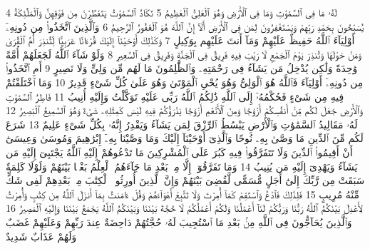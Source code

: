 {\tiny\colorbox{cl_aya}{4}} لَهُۥ مَا فِى ٱلسَّمَٰوَٰتِ وَمَا فِى ٱلْأَرْضِ وَهُوَ ٱلْعَلِىُّ ٱلْعَظِيمُ
{\tiny\colorbox{cl_aya}{5}} تَكَادُ ٱلسَّمَٰوَٰتُ يَتَفَطَّرْنَ مِن فَوْقِهِنَّ وَٱلْمَلَٰٓئِكَةُ يُسَبِّحُونَ بِحَمْدِ رَبِّهِمْ وَيَسْتَغْفِرُونَ لِمَن فِى ٱلْأَرْضِ أَلَآ إِنَّ ٱللَّهَ هُوَ ٱلْغَفُورُ ٱلرَّحِيمُ
{\tiny\colorbox{cl_aya}{6}} وَٱلَّذِينَ ٱتَّخَذُوا۟ مِن دُونِهِۦٓ أَوْلِيَآءَ ٱللَّهُ حَفِيظٌ عَلَيْهِمْ وَمَآ أَنتَ عَلَيْهِم بِوَكِيلٍ
{\tiny\colorbox{cl_aya}{7}} وَكَذَٰلِكَ أَوْحَيْنَآ إِلَيْكَ قُرْءَانًا عَرَبِيًّا لِّتُنذِرَ أُمَّ ٱلْقُرَىٰ وَمَنْ حَوْلَهَا وَتُنذِرَ يَوْمَ ٱلْجَمْعِ لَا رَيْبَ فِيهِ فَرِيقٌ فِى ٱلْجَنَّةِ وَفَرِيقٌ فِى ٱلسَّعِيرِ
{\tiny\colorbox{cl_aya}{8}} وَلَوْ شَآءَ ٱللَّهُ لَجَعَلَهُمْ أُمَّةً وَٰحِدَةً وَلَٰكِن يُدْخِلُ مَن يَشَآءُ فِى رَحْمَتِهِۦ وَٱلظَّٰلِمُونَ مَا لَهُم مِّن وَلِىٍّ وَلَا نَصِيرٍ
{\tiny\colorbox{cl_aya}{9}} أَمِ ٱتَّخَذُوا۟ مِن دُونِهِۦٓ أَوْلِيَآءَ فَٱللَّهُ هُوَ ٱلْوَلِىُّ وَهُوَ يُحْىِ ٱلْمَوْتَىٰ وَهُوَ عَلَىٰ كُلِّ شَىْءٍ قَدِيرٌ
{\tiny\colorbox{cl_aya}{10}} وَمَا ٱخْتَلَفْتُمْ فِيهِ مِن شَىْءٍ فَحُكْمُهُۥٓ إِلَى ٱللَّهِ ذَٰلِكُمُ ٱللَّهُ رَبِّى عَلَيْهِ تَوَكَّلْتُ وَإِلَيْهِ أُنِيبُ
{\tiny\colorbox{cl_aya}{11}} فَاطِرُ ٱلسَّمَٰوَٰتِ وَٱلْأَرْضِ جَعَلَ لَكُم مِّنْ أَنفُسِكُمْ أَزْوَٰجًا وَمِنَ ٱلْأَنْعَٰمِ أَزْوَٰجًا يَذْرَؤُكُمْ فِيهِ لَيْسَ كَمِثْلِهِۦ شَىْءٌ وَهُوَ ٱلسَّمِيعُ ٱلْبَصِيرُ
{\tiny\colorbox{cl_aya}{12}} لَهُۥ مَقَالِيدُ ٱلسَّمَٰوَٰتِ وَٱلْأَرْضِ يَبْسُطُ ٱلرِّزْقَ لِمَن يَشَآءُ وَيَقْدِرُ إِنَّهُۥ بِكُلِّ شَىْءٍ عَلِيمٌ
{\tiny\colorbox{cl_aya}{13}} شَرَعَ لَكُم مِّنَ ٱلدِّينِ مَا وَصَّىٰ بِهِۦ نُوحًا وَٱلَّذِىٓ أَوْحَيْنَآ إِلَيْكَ وَمَا وَصَّيْنَا بِهِۦٓ إِبْرَٰهِيمَ وَمُوسَىٰ وَعِيسَىٰٓ أَنْ أَقِيمُوا۟ ٱلدِّينَ وَلَا تَتَفَرَّقُوا۟ فِيهِ كَبُرَ عَلَى ٱلْمُشْرِكِينَ مَا تَدْعُوهُمْ إِلَيْهِ ٱللَّهُ يَجْتَبِىٓ إِلَيْهِ مَن يَشَآءُ وَيَهْدِىٓ إِلَيْهِ مَن يُنِيبُ
{\tiny\colorbox{cl_aya}{14}} وَمَا تَفَرَّقُوٓا۟ إِلَّا مِنۢ بَعْدِ مَا جَآءَهُمُ ٱلْعِلْمُ بَغْيًۢا بَيْنَهُمْ وَلَوْلَا كَلِمَةٌ سَبَقَتْ مِن رَّبِّكَ إِلَىٰٓ أَجَلٍ مُّسَمًّى لَّقُضِىَ بَيْنَهُمْ وَإِنَّ ٱلَّذِينَ أُورِثُوا۟ ٱلْكِتَٰبَ مِنۢ بَعْدِهِمْ لَفِى شَكٍّ مِّنْهُ مُرِيبٍ
{\tiny\colorbox{cl_aya}{15}} فَلِذَٰلِكَ فَٱدْعُ وَٱسْتَقِمْ كَمَآ أُمِرْتَ وَلَا تَتَّبِعْ أَهْوَآءَهُمْ وَقُلْ ءَامَنتُ بِمَآ أَنزَلَ ٱللَّهُ مِن كِتَٰبٍ وَأُمِرْتُ لِأَعْدِلَ بَيْنَكُمُ ٱللَّهُ رَبُّنَا وَرَبُّكُمْ لَنَآ أَعْمَٰلُنَا وَلَكُمْ أَعْمَٰلُكُمْ لَا حُجَّةَ بَيْنَنَا وَبَيْنَكُمُ ٱللَّهُ يَجْمَعُ بَيْنَنَا وَإِلَيْهِ ٱلْمَصِيرُ
{\tiny\colorbox{cl_aya}{16}} وَٱلَّذِينَ يُحَآجُّونَ فِى ٱللَّهِ مِنۢ بَعْدِ مَا ٱسْتُجِيبَ لَهُۥ حُجَّتُهُمْ دَاحِضَةٌ عِندَ رَبِّهِمْ وَعَلَيْهِمْ غَضَبٌ وَلَهُمْ عَذَابٌ شَدِيدٌ

